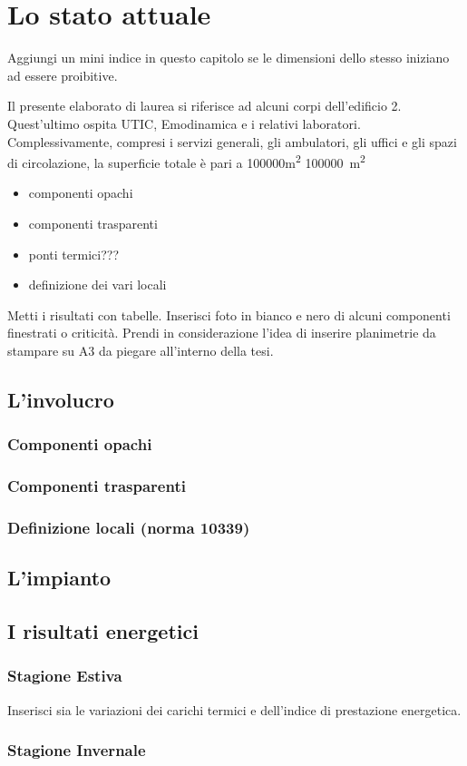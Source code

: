 \chapter{Lo stato attuale}
\thispagestyle{empty}

Aggiungi un mini indice in questo capitolo se le dimensioni dello stesso iniziano ad essere proibitive.

Il presente elaborato di laurea si riferisce ad alcuni corpi dell'edificio 2. Quest'ultimo ospita UTIC, Emodinamica e i relativi laboratori. Complessivamente, compresi i servizi generali, gli ambulatori, gli uffici e gli spazi di circolazione, la superficie totale è pari a \num{100000}\si{m^2} \SI{100000}{m^2} 
\begin{itemize}
	\item componenti opachi
	\item componenti trasparenti
	\item ponti termici???
	\item definizione dei vari locali
\end{itemize}
Metti i risultati con tabelle. 
Inserisci foto in bianco e nero di alcuni componenti finestrati o criticità.
Prendi in considerazione l'idea di inserire planimetrie da stampare su A3 da piegare all'interno della tesi. 
\section{L'involucro}
\subsection{Componenti opachi}
\subsection{Componenti trasparenti}
\subsection{Definizione locali (norma 10339)}
\section{L'impianto}
\section{I risultati energetici}
\subsection{Stagione Estiva}
Inserisci sia le variazioni dei carichi termici e dell'indice di prestazione energetica.
\subsection{Stagione Invernale}
